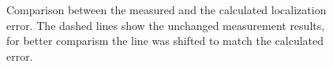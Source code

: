 \begin{figure}
\hfill
{}
	\caption{Comparison between the measured and the calculated localization error. The dashed lines show the unchanged measurement results, for better comparism the line was shifted to match the calculated error.}
	\label{matchedFilter2}	
\end{figure}

